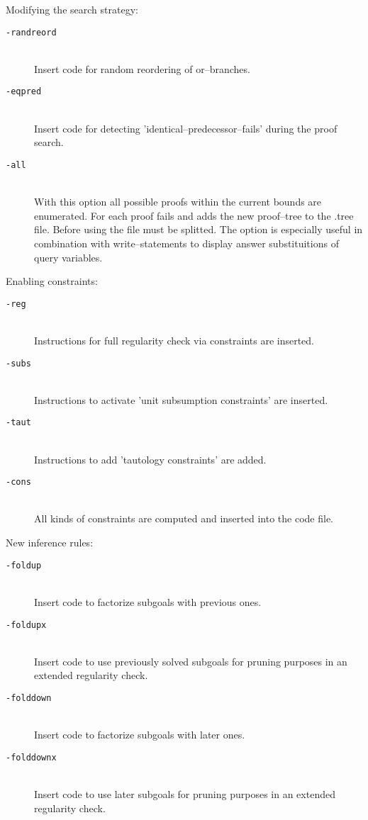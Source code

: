 \begin{description}
{      Modifying the search strategy:
      \begin{description}
      \item[{\tt -randreord}]
           {\ \\
            Insert code for random reordering of or--branches.}
      \item[{\tt -eqpred}]
           {\ \\
            Insert code for detecting 'identical--predecessor--fails'
            during the proof search.}
      \item[{\tt -all}]
           {\ \\
            With this option all possible proofs within the current
            bounds  are enumerated. For each proof \SE\/ fails and
            adds the new proof--tree to the .tree file. Before using
            \xp\/  the  file  must  be  splitted. The option is
            especially useful in combination with  write--statements
            to display answer substituitions of query variables.}
      \end{description}     

      Enabling constraints:
      \begin{description}
      \item[{\tt -reg}]
           {\ \\
            Instructions for full regularity check via  constraints
            are inserted.}
      \item[{\tt -subs}]
           {\ \\
            Instructions to activate 'unit subsumption constraints'
            are inserted.}
      \item[{\tt -taut}]
           {\ \\
            Instructions to add 'tautology constraints' are added.}
      \item[{\tt -cons}]
           {\ \\
            All kinds of constraints are computed and inserted into
            the code file.}
      \end{description}     

      New inference rules:
      \begin{description}     
      \item[{\tt -foldup}]
           {\ \\
            Insert code to factorize subgoals with previous ones.}
      \item[{\tt -foldupx}]
           {\ \\
            Insert code to use previously solved subgoals for pruning 
            purposes in an extended regularity check.}
      \item[{\tt -folddown}]
           {\ \\
            Insert code to factorize subgoals with later ones.}
      \item[{\tt -folddownx}]
           {\ \\
            Insert code to use later subgoals for pruning  purposes
            in an extended regularity check.}
      \end{description}   

}
\end{description}
